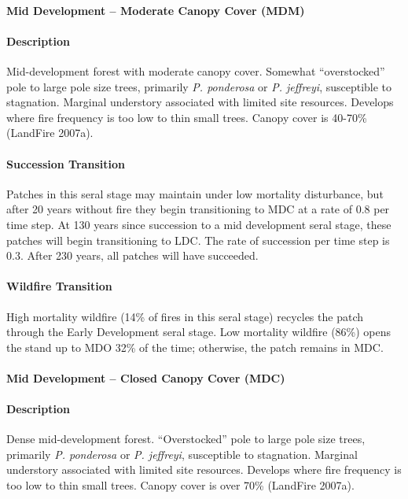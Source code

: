\noindent\hrulefill

\paragraph{Mid Development – Moderate Canopy Cover (MDM)}

\paragraph{Description} Mid-development forest with moderate canopy cover. Somewhat ``overstocked'' pole to large pole size trees, primarily \emph{P. ponderosa} or \emph{P. jeffreyi}, susceptible to stagnation. Marginal understory associated with limited site resources. Develops where fire frequency is too low to thin small trees. Canopy cover is 40-70\% (LandFire 2007a).

\paragraph{Succession Transition} Patches in this seral stage may maintain under low mortality disturbance, but after 20 years without fire they begin transitioning to MDC at a rate of 0.8 per time step. At 130 years since succession to a mid development seral stage, these patches will begin transitioning to LDC. The rate of succession per time step is 0.3. After 230 years, all patches will have succeeded.

\paragraph{Wildfire Transition} High mortality wildfire (14\% of fires in this seral stage) recycles the patch through the Early Development seral stage. Low mortality wildfire (86\%) opens the stand up to MDO 32\% of the time; otherwise, the patch remains in MDC.

\noindent\hrulefill

\paragraph{Mid Development – Closed Canopy Cover (MDC)}

\paragraph{Description} Dense mid-development forest. ``Overstocked'' pole to large pole size trees, primarily \emph{P. ponderosa} or \emph{P. jeffreyi}, susceptible to stagnation. Marginal understory associated with limited site resources. Develops where fire frequency is too low to thin small trees. Canopy cover is over 70\% (LandFire 2007a).

